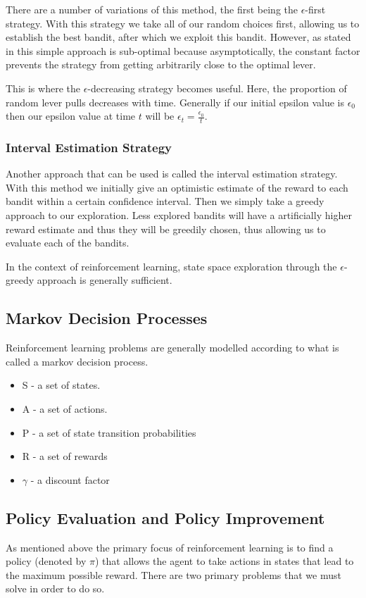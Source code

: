 There are a number of variations of this method, the first being the $\epsilon$-first strategy.
With this strategy we take all of our random choices first, allowing us to establish the best bandit,
after which we exploit this bandit.
However, as stated in\citep{vermorel2005multi} this simple approach is sub-optimal because asymptotically,
the constant factor prevents the strategy from getting arbitrarily close to
the optimal lever.

This is where the $\epsilon$-decreasing strategy becomes useful.
Here, the proportion of random lever pulls decreases with time.
Generally if our initial epsilon value is $\epsilon_0$ then our epsilon value at time $t$ will be
$\epsilon_t = \frac{\epsilon_0}{t}$.

\subsubsection{Interval Estimation Strategy}
Another approach that can be used is called the interval estimation strategy.
With this method we initially give an optimistic estimate of the reward to each bandit within a certain
confidence interval.
Then we simply take a greedy approach to our exploration.
Less explored bandits will have a artificially higher reward estimate and thus they will be greedily chosen,
thus allowing us to evaluate each of the bandits.

In the context of reinforcement learning, state space exploration through the $\epsilon$-greedy approach is
generally sufficient.

\subsection{Markov Decision Processes}\label{subsec:mdp}
Reinforcement learning problems are generally modelled according to what is called a markov decision process.

\begin{itemize}
    \item S - a set of states.
    \item A - a set of actions.
    \item P - a set of state transition probabilities
    \item R - a set of rewards
    \item $\gamma$ - a discount factor
\end{itemize}

\subsection{Policy Evaluation and Policy Improvement}\label{subsec:policyEvalPolicyImp}
As mentioned above the primary focus of reinforcement learning is to find a policy (denoted by $\pi$) that allows
the agent to take actions in states that lead to the maximum possible reward.
There are two primary problems that we must solve in order to do so.

